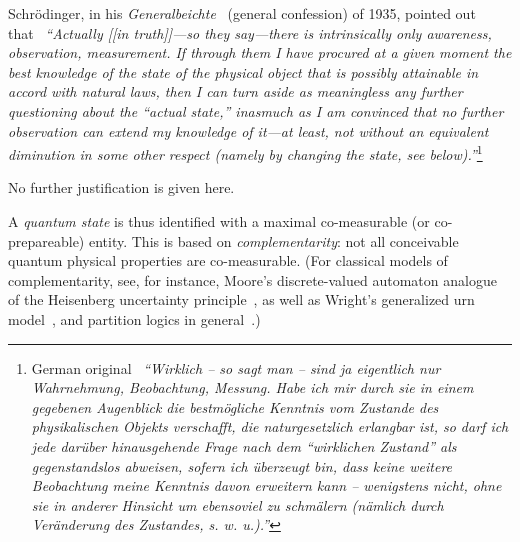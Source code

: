 Schr\"odinger, in his  {\em Generalbeichte}~\cite[Footnote~1, p.~845]{schrodinger} (general confession) of 1935,
pointed out that~\cite[\S~6, p.~328]{schrodinger-en-10.2307/986572} {\em ``Actually [[in truth]]---so they say---there is intrinsically only awareness, observation, measurement.
If through them I have procured at a given moment the best knowledge
of the state of the physical object that is possibly attainable in accord with natural laws,
then I can turn aside as meaningless any further questioning about the ``actual state,''
inasmuch as I am convinced that no further observation can extend my knowledge of it---at least,
not without an equivalent diminution in some other respect
(namely by changing the state, see below).''}\footnote{
German original~\cite[\S~6, p.~823]{schrodinger}
{\em
``Wirklich -- so sagt
man -- sind ja eigentlich nur Wahrnehmung,
Beobachtung, Messung. Habe ich mir durch sie
in einem gegebenen Augenblick die bestm\"ogliche
Kenntnis vom Zustande des physikalischen Objekts
verschafft, die naturgesetzlich erlangbar ist,
so darf ich jede dar\"uber hinausgehende Frage nach
dem ``wirklichen Zustand'' als gegenstandslos abweisen,
sofern ich \"uberzeugt bin, dass keine weitere
Beobachtung meine Kenntnis davon erweitern
kann -- wenigstens nicht, ohne sie in anderer
Hinsicht um ebensoviel zu schm\"alern (n\"amlich
durch Ver\"anderung des Zustandes, s. w. u.).''}}


No further justification is given here.

A {\em quantum state}
is thus
identified with a maximal co-measurable (or co-prepareable) entity.
This is based on
{\em complementarity}:
not all conceivable quantum physical properties
are co-measurable.
(For classical models of complementarity, see, for instance,
Moore's discrete-valued automaton analogue
of the Heisenberg uncertainty principle~\cite{e-f-moore,svozil-93,schaller-96},
as well as Wright's generalized urn model~\cite{wright}, and partition logics in general~\cite{svozil-2008-ql}.)


